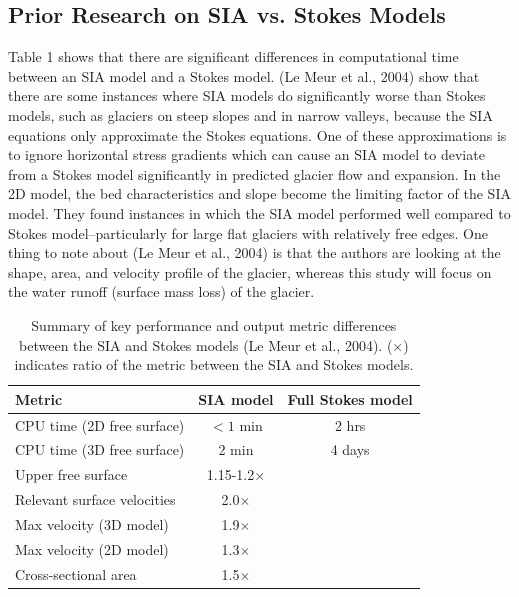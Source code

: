 \documentclass{article}
\begin{document}
\subsection{Prior Research on SIA vs. Stokes Models}
Table 1 shows that there are significant differences in computational time between an SIA model and a Stokes model. 
(Le Meur et al., 2004) show that there are some instances where SIA models do significantly worse than 
Stokes models, such as glaciers on steep slopes and in narrow valleys, because the SIA equations only approximate the Stokes 
equations. One of these approximations is to ignore horizontal stress gradients which can cause an SIA model to deviate from a Stokes model 
significantly in predicted glacier flow and expansion. In the 2D model, the bed characteristics and slope become the limiting factor of the SIA model.
They found instances in which the SIA model performed well 
compared to Stokes model--particularly for large flat glaciers with relatively free edges. One thing to note about (Le Meur et al., 2004) is 
that the authors are looking at the shape, area, and velocity profile of the glacier, whereas this study will focus on the water runoff 
(surface mass loss) of the glacier.
\begin{table}[ht]
    \centering
    \begin{tabular}{lcc}
      \hline
      \textbf{Metric} & \textbf{SIA model} & \textbf{Full Stokes model} \\
      \hline
      CPU time (2D free surface)                & $<1$ min        & 2 hrs    \\
      CPU time (3D free surface)                & 2 min  & 4 days    \\
      Upper free surface        & 1.15-1.2×    &    \\
      Relevant surface velocities    & 2.0×   &      \\
      Max velocity (3D model)               & 1.9×         &       \\
      Max velocity (2D model)               & 1.3×         &        \\
      Cross-sectional area        & 1.5×         &       \\
      \hline
    \end{tabular}
    \caption{Summary of key performance and output metric differences between the SIA and Stokes models (Le Meur et al., 2004). (×) indicates ratio of the metric between the SIA and Stokes models.}
    \label{tab:sia_vs_stokes}
  \end{table}
\FloatBarrier  
  
\end{document}
